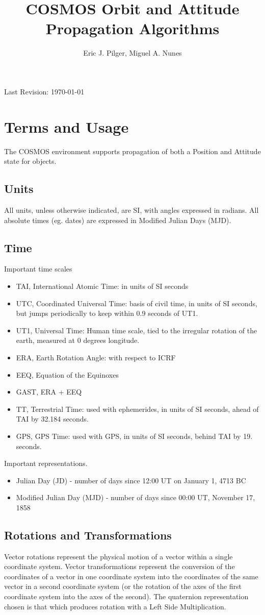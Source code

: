 \documentclass[12pt,letterpaper]{paper}
\title{COSMOS Orbit and Attitude Propagation Algorithms}
\author{Eric J. Pilger, Miguel A. Nunes}
\begin{document}
\maketitle
\noindent
Last Revision: \today
\tableofcontents

\section{Terms and Usage}
The COSMOS environment supports propagation of both a Position and Attitude state for objects. 
\subsection{Units}
All units, unless otherwise indicated, are SI, with angles expressed in radians. All absolute times (eg. dates) are expressed in Modified Julian Days (MJD).
\subsection{Time}
Important time scales
\begin{itemize}
\item TAI, International Atomic Time: in units of SI seconds
\item UTC, Coordinated Universal Time: basis of civil time, in units of SI seconds, but jumps periodically to keep within 0.9 seconds of UT1.
\item UT1, Universal Time: Human time scale, tied to the irregular rotation of the earth, measured at 0 degrees longitude.
\item ERA, Earth Rotation Angle: with respect to ICRF
\item EEQ, Equation of the Equinoxes
\item GAST, ERA + EEQ
\item TT, Terrestrial Time: used with ephemerides, in units of SI seconds, ahead of TAI by 32.184 seconds.
\item GPS, GPS Time: used with GPS, in units of SI seconds, behind TAI by 19. seconds.
\end{itemize}
Important representations.
\begin{itemize}
\item Julian Day (JD) - number of days since 12:00 UT on January 1, 4713 BC
\item Modified Julian Day (MJD) - number of days since 00:00 UT, November 17, 1858
\end{itemize}
\subsection{Rotations and Transformations}
Vector rotations represent the physical motion of a vector within a single coordinate system. Vector transformations represent the conversion of the coordinates of a vector in one coordinate system into the coordinates of the same vector in a second coordinate system (or the rotation of the axes of the first coordinate system into the axes of the second). The quaternion representation chosen is that which produces rotation with a Left Side Multiplication.
\end{document}
